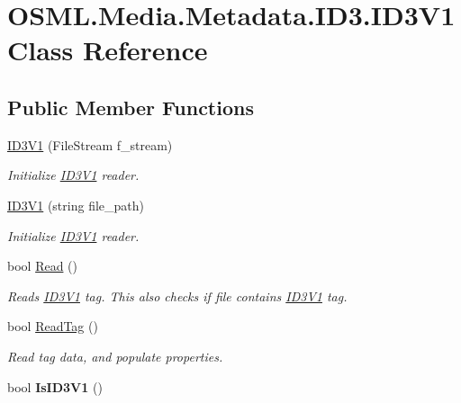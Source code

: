 \hypertarget{classOSML_1_1Media_1_1Metadata_1_1ID3_1_1ID3V1}{}\section{O\+S\+M\+L.\+Media.\+Metadata.\+I\+D3.\+I\+D3\+V1 Class Reference}
\label{classOSML_1_1Media_1_1Metadata_1_1ID3_1_1ID3V1}
\subsection*{Public Member Functions}
\begin{DoxyCompactItemize}
\item 
\mbox{\hyperlink{classOSML_1_1Media_1_1Metadata_1_1ID3_1_1ID3V1_a9cdd3523c5ebb8c9da4d8fc70123fc7f}{I\+D3\+V1}} (File\+Stream f\+\_\+stream)
\begin{DoxyCompactList}\small\item\em Initialize \mbox{\hyperlink{classOSML_1_1Media_1_1Metadata_1_1ID3_1_1ID3V1}{I\+D3\+V1}} reader. \end{DoxyCompactList}\item 
\mbox{\hyperlink{classOSML_1_1Media_1_1Metadata_1_1ID3_1_1ID3V1_a7d3a5eb0d0d6526d23e539b8abe91aae}{I\+D3\+V1}} (string file\+\_\+path)
\begin{DoxyCompactList}\small\item\em Initialize \mbox{\hyperlink{classOSML_1_1Media_1_1Metadata_1_1ID3_1_1ID3V1}{I\+D3\+V1}} reader. \end{DoxyCompactList}\item 
bool \mbox{\hyperlink{classOSML_1_1Media_1_1Metadata_1_1ID3_1_1ID3V1_aca3a750df2cf6a6183a6a2aceb72ffc9}{Read}} ()
\begin{DoxyCompactList}\small\item\em Reads \mbox{\hyperlink{classOSML_1_1Media_1_1Metadata_1_1ID3_1_1ID3V1}{I\+D3\+V1}} tag. This also checks if file contains \mbox{\hyperlink{classOSML_1_1Media_1_1Metadata_1_1ID3_1_1ID3V1}{I\+D3\+V1}} tag. \end{DoxyCompactList}\item 
bool \mbox{\hyperlink{classOSML_1_1Media_1_1Metadata_1_1ID3_1_1ID3V1_a70ec630b28cb47c0c231c9e99aa3ccd7}{Read\+Tag}} ()
\begin{DoxyCompactList}\small\item\em Read tag data, and populate properties. \end{DoxyCompactList}\item 
\mbox{\label{classOSML_1_1Media_1_1Metadata_1_1ID3_1_1ID3V1_a4c01c0f2722a9277b7b1d17e20e15da6}} 
bool {\bfseries Is\+I\+D3\+V1} ()
\end{DoxyCompactItemize}
